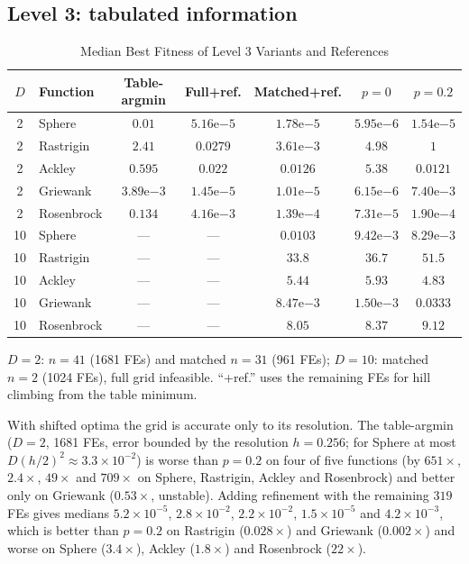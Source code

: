 \documentclass[conference]{IEEEtran}
\begin{document}
\subsection{Level 3: tabulated information}
\begin{table}[t]
\centering
\caption{Median Best Fitness of Level 3 Variants and References}
\label{tab:l3}
\scriptsize
\setlength{\tabcolsep}{1.6pt}
\begin{tabular}{@{}clccccc@{}}
\toprule
$D$ & Function & Table-argmin & Full+ref. & Matched+ref. & $p{=}0$ & $p{=}0.2$\\
\midrule
2 & Sphere & $0.01$ & $5.16\mathrm{e}{-5}$ & $1.78\mathrm{e}{-5}$ & $5.95\mathrm{e}{-6}$ & $1.54\mathrm{e}{-5}$ \\
2 & Rastrigin & $2.41$ & $0.0279$ & $3.61\mathrm{e}{-3}$ & $4.98$ & $1$ \\
2 & Ackley & $0.595$ & $0.022$ & $0.0126$ & $5.38$ & $0.0121$ \\
2 & Griewank & $3.89\mathrm{e}{-3}$ & $1.45\mathrm{e}{-5}$ & $1.01\mathrm{e}{-5}$ & $6.15\mathrm{e}{-6}$ & $7.40\mathrm{e}{-3}$ \\
2 & Rosenbrock & $0.134$ & $4.16\mathrm{e}{-3}$ & $1.39\mathrm{e}{-4}$ & $7.31\mathrm{e}{-5}$ & $1.90\mathrm{e}{-4}$ \\
\midrule
10 & Sphere & --- & --- & $0.0103$ & $9.42\mathrm{e}{-3}$ & $8.29\mathrm{e}{-3}$ \\
10 & Rastrigin & --- & --- & $33.8$ & $36.7$ & $51.5$ \\
10 & Ackley & --- & --- & $5.44$ & $5.93$ & $4.83$ \\
10 & Griewank & --- & --- & $8.47\mathrm{e}{-3}$ & $1.50\mathrm{e}{-3}$ & $0.0333$ \\
10 & Rosenbrock & --- & --- & $8.05$ & $8.37$ & $9.12$ \\
\bottomrule
\end{tabular}

\smallskip
\footnotesize $D=2$: $n=41$ (1681 FEs) and matched $n=31$ (961 FEs); $D=10$: matched $n=2$ (1024 FEs), full grid infeasible. ``+ref.'' uses the remaining FEs for hill climbing from the table minimum.
\end{table}

With shifted optima the grid is accurate only to its resolution. The table-argmin ($D=2$, 1681 FEs, error bounded by the resolution $h=0.256$; for Sphere at most $D(h/2)^2\approx3.3\times10^{-2}$) is worse than $p=0.2$ on four of five functions (by $651\times$, $2.4\times$, $49\times$ and $709\times$ on Sphere, Rastrigin, Ackley and Rosenbrock) and better only on Griewank ($0.53\times$, unstable). Adding refinement with the remaining $319$ FEs gives medians $5.2\times10^{-5}$, $2.8\times10^{-2}$, $2.2\times10^{-2}$, $1.5\times10^{-5}$ and $4.2\times10^{-3}$, which is better than $p=0.2$ on Rastrigin ($0.028\times$) and Griewank ($0.002\times$) and worse on Sphere ($3.4\times$), Ackley ($1.8\times$) and Rosenbrock ($22\times$).
\end{document}

